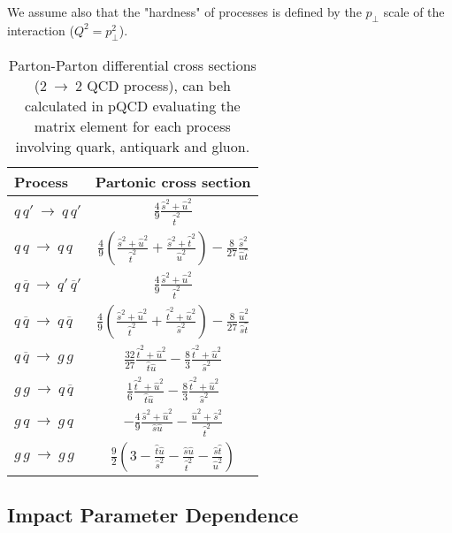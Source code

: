 \documentclass[10pt]{article}
\begin{document}
We assume also that the "hardness" of processes is defined by the $p_\perp$ scale of the interaction ($Q^2=p_\perp^2$).

\begin{table}[h!]
	\centering
	\begin{tabular}{l | c}\rule{0pt}{3ex} 
	Process & Partonic cross section \rule{0pt}{3.5ex}\\   \hline\hline 
	$q\,q'\ \rightarrow\ q\,q'$ & $\frac{4}{9}\frac{\hat{s}^2+\hat{u}^2}{\hat{t}^2}$\rule{0pt}{3.5ex}\\
	$q\,q\ \rightarrow\ q\,q$ & $\frac{4}{9}\left(\frac{\hat{s}^2+\hat{u}^2}{\hat{t}^2}+\frac{\hat{s}^2+\hat{t}^2}{\hat{u}^2}\right) -\frac{8}{27}\frac{\hat{s}^2}{\hat{u}\hat{t}}$\rule{0pt}{3.5ex}\\
	$q\,\overline{q}\ \rightarrow\ q'\,\overline{q}'$ & $\frac{4}{9}\frac{\hat{s}^2+\hat{u}^2}{\hat{t}^2}$\rule{0pt}{3.5ex}\\
	$q\,\overline{q}\ \rightarrow\ q\,\overline{q}$ & $\frac{4}{9}\left(\frac{\hat{s}^2+\hat{u}^2}{\hat{t}^2}+\frac{\hat{t}^2+\hat{u}^2}{\hat{s}^2}\right) -\frac{8}{27}\frac{\hat{u}^2}{\hat{s}\hat{t}}$\rule{0pt}{3.5ex}\\
	$q\,\overline{q}\ \rightarrow\ g\,g$ & $\frac{32}{27}\frac{\hat{t}^2+\hat{u}^2}{\hat{t}\hat{u}}-\frac{8}{3}\frac{\hat{t}^2+\hat{u}^2}{\hat{s}^2}$\rule{0pt}{3.5ex}\\
	$g\,g\ \rightarrow\ q\,\overline{q}$ & $\frac{1}{6}\frac{\hat{t}^2+\hat{u}^2}{\hat{t}\hat{u}}-\frac{8}{3}\frac{\hat{t}^2+\hat{u}^2}{\hat{s}^2}$\rule{0pt}{3.5ex}\\
	$g\,q\ \rightarrow\ g\,q$ & $-\frac{4}{9}\frac{\hat{s}^2+\hat{u}^2}{\hat{s}\hat{u}}-\frac{\hat{u}^2+\hat{s}^2}{\hat{t}^2}$\rule{0pt}{3.5ex}\\
	$g\,g\ \rightarrow\ g\,g$ & $\frac{9}{2}\left( 3-\frac{\hat{t}\hat{u}}{\hat{s}^2} -\frac{\hat{s}\hat{u}}{\hat{t}^2} - \frac{\hat{s}\hat{t}}{\hat{u}^2} \right)$\rule{0pt}{3.5ex}
	\end{tabular}
	\caption{Parton-Parton differential cross sections ($2\ \rightarrow\ 2$ QCD process), can beh calculated in pQCD evaluating the matrix element for each process involving quark, antiquark and gluon.}
	\label{table:partonic_cross_sections}
\end{table}

\subsection{Impact Parameter Dependence}
\end{document}
